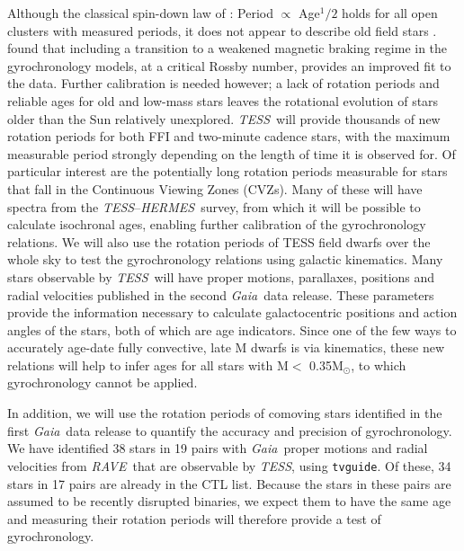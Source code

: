 \documentclass[letterpaper,12pt,preprint]{hack_aastex}
\newcommand{\Kepler}{{\it Kepler}}
\newcommand{\kepler}{\Kepler}
\newcommand{\TESS}{{\it TESS}}
\newcommand{\tess}{{\it TESS}}
\newcommand{\Gaia}{{\it Gaia}}
\newcommand{\RAVE}{{\it RAVE}}
\newcommand{\hermes}{{\it HERMES}}
\newcommand{\HERMES}{{\it HERMES}}
\begin{document}
Although the classical spin-down law of \citet{skumanich1972}: Period
$\propto$ Age$^1/2$ holds for all open clusters with measured periods, it does
not appear to describe old field stars \citep{angus2015, van-saders2016}.
\citet{van-saders2016} found that including a transition to a weakened magnetic
braking regime in the gyrochronology models, at a critical Rossby number,
provides an improved fit to the data.
Further calibration is needed however; a lack of rotation periods and reliable
ages for old and low-mass stars leaves the rotational evolution of stars older
than the Sun relatively unexplored.
\TESS\ will provide thousands of new rotation periods for both FFI and
two-minute cadence stars, with the maximum measurable period strongly
depending on the length of time it is observed for.
Of particular interest are the potentially long rotation periods measurable
for stars that fall in the Continuous Viewing Zones (CVZs).
Many of these will have spectra from the \TESS --\HERMES\ survey, from which it
will be possible to calculate isochronal ages, enabling further calibration of
the gyrochronology relations.
We will also use the rotation periods of TESS field dwarfs over the whole sky
to test the gyrochronology relations using galactic kinematics.
Many stars observable by \tess\ will have proper motions, parallaxes,
positions and radial velocities published in the second \Gaia\ data release.
These parameters provide the information necessary to calculate galactocentric
positions and action angles of the stars, both of which are age indicators.
Since one of the few ways to accurately age-date fully convective, late M
dwarfs is via kinematics, these new relations will help to infer ages for all
stars with M$<$ 0.35M$_\odot$, to which gyrochronology cannot be applied.

In addition, we will use the rotation periods of comoving stars identified in
the first \Gaia\ data release \citep{oh2016} to quantify the accuracy and
precision of gyrochronology.
We have identified 38 stars in 19 pairs with \Gaia\ proper motions and radial
velocities from \RAVE\ that are observable by \TESS, using {\tt tvguide}.
Of these, 34 stars in 17 pairs are already in the CTL list.
Because the stars in these pairs are assumed to be recently disrupted
binaries, we expect them to have the same age and measuring their rotation
periods will therefore provide a test of gyrochronology.
\end{document}
